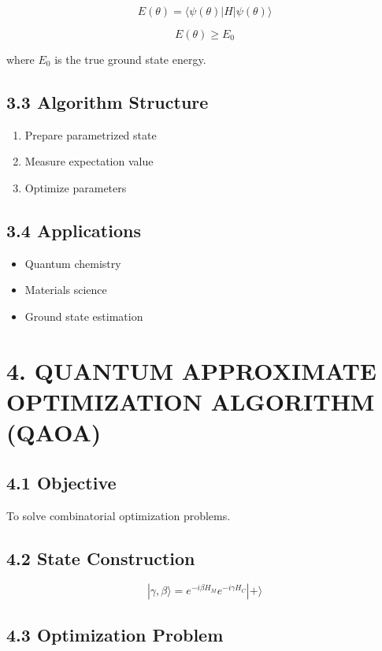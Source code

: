 \[
E(\theta) = \langle \psi(\theta) | H | \psi(\theta) \rangle
\]

\[
E(\theta) \geq E_0
\]

where $E_0$ is the true ground state energy.

\subsection*{3.3 Algorithm Structure}

\begin{enumerate}
\item Prepare parametrized state
\item Measure expectation value
\item Optimize parameters
\end{enumerate}

\subsection*{3.4 Applications}

\begin{itemize}
\item Quantum chemistry
\item Materials science
\item Ground state estimation
\end{itemize}

\vspace{0.5cm}

\section*{4. QUANTUM APPROXIMATE OPTIMIZATION ALGORITHM (QAOA)}

\subsection*{4.1 Objective}

To solve combinatorial optimization problems.

\subsection*{4.2 State Construction}

\[
|\gamma, \beta\rangle = e^{-i\beta H_M} e^{-i\gamma H_C} |+\rangle
\]

\subsection*{4.3 Optimization Problem}


